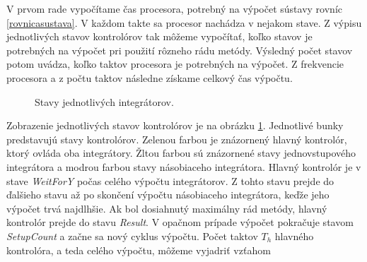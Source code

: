 V prvom rade vypočítame čas procesora, potrebný na výpočet sústavy rovníc \ref{rovnicasustava}. V každom takte sa procesor nachádza v nejakom stave. Z výpisu jednotlivých stavov kontrolórov tak môžeme vypočítať, koľko stavov je potrebných na výpočet pri použití rôzneho rádu metódy. Výsledný počet stavov potom uvádza, koľko taktov procesora je potrebných na výpočet. Z frekvencie procesora a z počtu taktov následne získame celkový čas výpočtu.

\bigskip
\begin{figure}[h]
\centering
{}
\caption{Stavy jednotlivých integrátorov.}
\label{stavyimg}
\end{figure}

Zobrazenie jednotlivých stavov kontrolórov je na obrázku \ref{stavyimg}. Jednotlivé bunky predstavujú stavy kontrolórov. Zelenou farbou je znázornený hlavný kontrolór, ktorý ovláda oba integrátory. Žltou farbou sú znázornené stavy jednovstupového integrátora a modrou farbou stavy násobiaceho integrátora. Hlavný kontrolór je v stave \textit{WeitForY} počas celého výpočtu integrátorov. Z tohto stavu prejde do ďalšieho stavu až po skončení výpočtu násobiaceho integrátora, keďže jeho výpočet trvá najdlhšie. Ak bol dosiahnutý maximálny rád metódy, hlavný kontrolór prejde do stavu \textit{Result}. V opačnom prípade výpočet pokračuje stavom \textit{SetupCount} a začne sa nový cyklus výpočtu. Počet taktov $ T_h $ hlavného kontrolóra, a teda celého výpočtu, môžeme vyjadriť vzťahom

